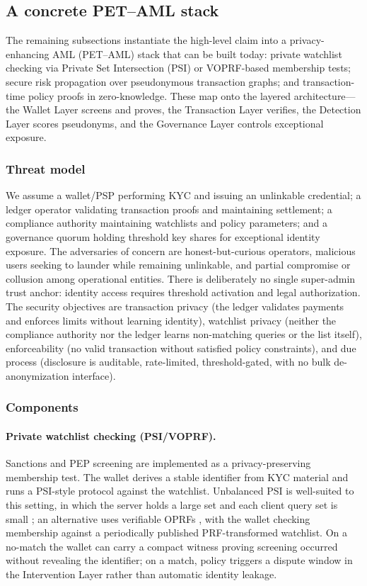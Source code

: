 \documentclass[11pt]{article}
\begin{document}
\subsection{A concrete PET--AML stack}
\label{sec:pet-aml-stack}

The remaining subsections instantiate the high-level claim into a privacy-enhancing AML (PET--AML)
stack that can be built today: private watchlist checking via Private Set Intersection (PSI) or
VOPRF-based membership tests; secure risk propagation over pseudonymous transaction graphs; and
transaction-time policy proofs in zero-knowledge. These map onto the layered architecture---the
Wallet Layer screens and proves, the Transaction Layer verifies, the Detection Layer scores
pseudonyms, and the Governance Layer controls exceptional exposure.

\subsubsection{Threat model}

We assume a wallet/PSP performing KYC and issuing an unlinkable credential; a ledger operator
validating transaction proofs and maintaining settlement; a compliance authority maintaining
watchlists and policy parameters; and a governance quorum holding threshold key shares for
exceptional identity exposure. The adversaries of concern are honest-but-curious operators, malicious
users seeking to launder while remaining unlinkable, and partial compromise or collusion among
operational entities. There is deliberately no single super-admin trust anchor: identity access
requires threshold activation and legal authorization. The security objectives are transaction
privacy (the ledger validates payments and enforces limits without learning identity), watchlist
privacy (neither the compliance authority nor the ledger learns non-matching queries or the list
itself), enforceability (no valid transaction without satisfied policy constraints), and due process
(disclosure is auditable, rate-limited, threshold-gated, with no bulk de-anonymization interface).

\subsubsection{Components}

\paragraph{Private watchlist checking (PSI/VOPRF).} Sanctions and PEP screening are implemented as a
privacy-preserving membership test. The wallet derives a stable identifier from KYC material and runs
a PSI-style protocol against the watchlist. Unbalanced PSI is well-suited to this setting, in which
the server holds a large set and each client query set is small \citep{Wang2025UnbalancedPSI}; an
alternative uses verifiable OPRFs \citep{rfc9497}, with the wallet checking membership against a
periodically published PRF-transformed watchlist. On a no-match the wallet can carry a compact
witness proving screening occurred without revealing the identifier; on a match, policy triggers a
dispute window in the Intervention Layer rather than automatic identity leakage.
\end{document}
